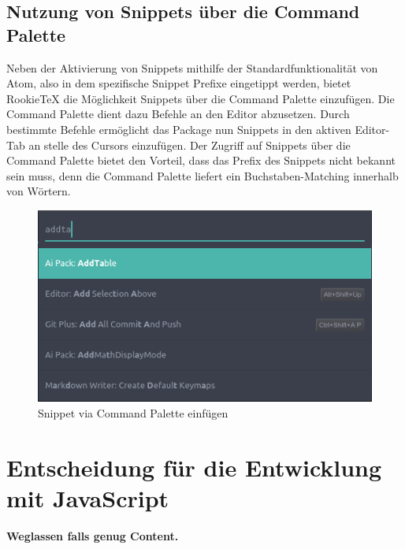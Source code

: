         \subsection{Nutzung von Snippets über die Command Palette}
            Neben der Aktivierung von Snippets mithilfe der Standardfunktionalität von Atom, also in dem spezifische Snippet Prefixe eingetippt werden, bietet RookieTeX die Möglichkeit Snippets über die Command Palette einzufügen. Die Command Palette dient dazu Befehle an den Editor abzusetzen. Durch bestimmte Befehle ermöglicht das Package nun \latex Snippets in den aktiven Editor-Tab an stelle des Cursors einzufügen. Der Zugriff auf Snippets über die Command Palette bietet den Vorteil, dass das Prefix des Snippets nicht bekannt sein muss, denn die Command Palette liefert ein Buchstaben-Matching innerhalb von Wörtern.
            \begin{figure}[H]
                \centering
                    \includegraphics[width=\textwidth]{img/snippets_via_cp.png}
                    \caption{Snippet via Command Palette einfügen}
            \end{figure}

    \section{Entscheidung für die Entwicklung mit JavaScript}
    \textbf{Weglassen falls genug Content.}

